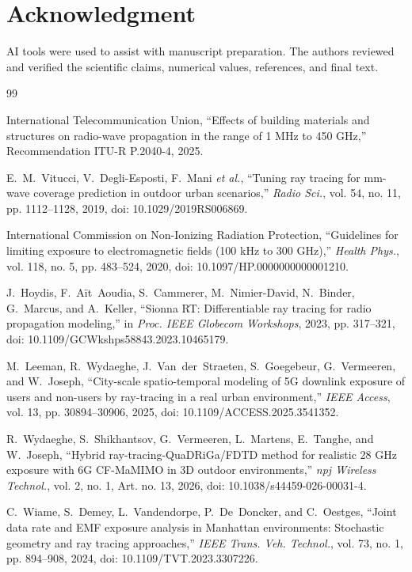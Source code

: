 \documentclass{ieeeaccess}
\begin{document}
\section*{Acknowledgment}

AI tools were used to assist with manuscript preparation. The authors reviewed
and verified the scientific claims, numerical values, references, and final
text.

\begin{thebibliography}{99}

International Telecommunication Union, ``Effects of building materials and
structures on radio-wave propagation in the range of 1 MHz to 450 GHz,''
Recommendation ITU-R P.2040-4, 2025.

E.~M.~Vitucci, V.~Degli-Esposti, F.~Mani \emph{et al.}, ``Tuning ray tracing for
mm-wave coverage prediction in outdoor urban scenarios,'' \emph{Radio Sci.},
vol. 54, no. 11, pp. 1112--1128, 2019,
doi: 10.1029/2019RS006869.

International Commission on Non-Ionizing Radiation Protection, ``Guidelines for
limiting exposure to electromagnetic fields (100 kHz to 300 GHz),'' \emph{Health
Phys.}, vol. 118, no. 5, pp. 483--524, 2020,
doi: 10.1097/HP.0000000000001210.

J.~Hoydis, F.~A\"it~Aoudia, S.~Cammerer, M.~Nimier-David, N.~Binder,
G.~Marcus, and A.~Keller, ``Sionna RT: Differentiable ray tracing for radio
propagation modeling,'' in \emph{Proc. IEEE Globecom Workshops}, 2023,
pp. 317--321, doi: 10.1109/GCWkshps58843.2023.10465179.

M.~Leeman, R.~Wydaeghe, J.~Van~der~Straeten, S.~Goegebeur, G.~Vermeeren, and
W.~Joseph, ``City-scale spatio-temporal modeling of 5G downlink exposure of
users and non-users by ray-tracing in a real urban environment,'' \emph{IEEE
Access}, vol. 13, pp. 30894--30906, 2025,
doi: 10.1109/ACCESS.2025.3541352.

R.~Wydaeghe, S.~Shikhantsov, G.~Vermeeren, L.~Martens, E.~Tanghe, and W.~Joseph,
``Hybrid ray-tracing-QuaDRiGa/FDTD method for realistic 28 GHz exposure with 6G
CF-MaMIMO in 3D outdoor environments,'' \emph{npj Wireless Technol.}, vol. 2,
no. 1, Art. no. 13, 2026, doi: 10.1038/s44459-026-00031-4.

C.~Wiame, S.~Demey, L.~Vandendorpe, P.~De~Doncker, and C.~Oestges, ``Joint data
rate and EMF exposure analysis in Manhattan environments: Stochastic geometry
and ray tracing approaches,'' \emph{IEEE Trans. Veh. Technol.}, vol. 73, no. 1,
pp. 894--908, 2024, doi: 10.1109/TVT.2023.3307226.


\end{thebibliography}
\end{document}
